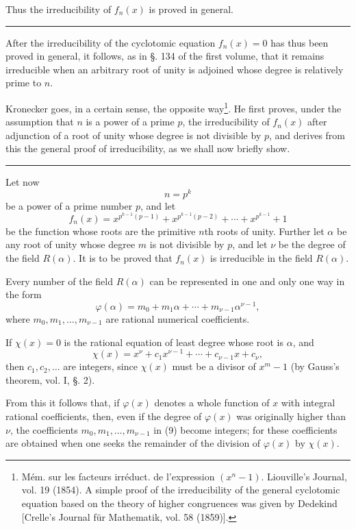 \documentclass[11pt]{article}
\begin{document}
Thus the irreducibility of $f_n(x)$ is proved in general.

\medskip\hrule\medskip

After the irreducibility of the cyclotomic equation $f_n(x)=0$ has thus been proved in general, it follows, as in §. 134 of the first volume, that it remains irreducible when an arbitrary root of unity is adjoined whose degree is relatively prime to $n$.

Kronecker goes, in a certain sense, the opposite way\footnote{Mém. sur les facteurs irréduct. de l'expression $(x^n-1)$. Liouville's Journal, vol. 19 (1854). A simple proof of the irreducibility of the general cyclotomic equation based on the theory of higher congruences was given by Dedekind [Crelle's Journal für Mathematik, vol. 58 (1859)].}. He first proves, under the assumption that $n$ is a power of a prime $p$, the irreducibility of $f_n(x)$ after adjunction of a root of unity whose degree is not divisible by $p$, and derives from this the general proof of irreducibility, as we shall now briefly show.

\medskip\hrule\medskip

Let now
\[
n=p^k
\]
be a power of a prime number $p$, and let
\begin{equation}\tag{8}
f_n(x)=x^{p^{k-1}(p-1)}+x^{p^{k-1}(p-2)}+\cdots+x^{p^{k-1}}+1
\end{equation}
be the function whose roots are the primitive $n$th roots of unity. Further let $\alpha$ be any root of unity whose degree $m$ is not divisible by $p$, and let $\nu$ be the degree of the field $R(\alpha)$. It is to be proved that $f_n(x)$ is irreducible in the field $R(\alpha)$.

Every number of the field $R(\alpha)$ can be represented in one and only one way in the form
\begin{equation}\tag{9}
\varphi(\alpha)=m_0+m_1\alpha+\cdots+m_{\nu-1}\alpha^{\nu-1},
\end{equation}
where $m_0,m_1,\ldots,m_{\nu-1}$ are rational numerical coefficients.

If $\chi(x)=0$ is the rational equation of least degree whose root is $\alpha$, and
\begin{equation}\tag{10}
\chi(x)=x^\nu+c_1x^{\nu-1}+\cdots+c_{\nu-1}x+c_\nu,
\end{equation}
then $c_1,c_2,\ldots$ are integers, since $\chi(x)$ must be a divisor of $x^m-1$ (by Gauss's theorem, vol. I, §. 2).

From this it follows that, if $\varphi(x)$ denotes a whole function of $x$ with integral rational coefficients, then, even if the degree of $\varphi(x)$ was originally higher than $\nu$, the coefficients $m_0,m_1,\ldots,m_{\nu-1}$ in (9) become integers; for these coefficients are obtained when one seeks the remainder of the division of $\varphi(x)$ by $\chi(x)$.
\end{document}
